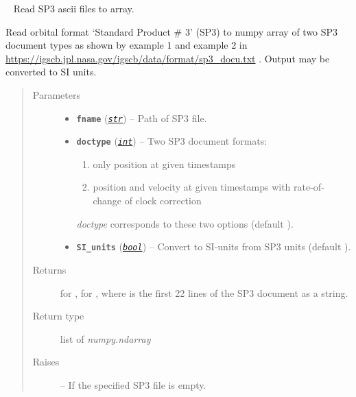 \documentclass[letterpaper,10pt,english]{sphinxhowto}
\begin{document}

\begin{fulllineitems}
\label{swtools_doc:swtools.read_sp3}~\label{swtools_doc:read-sp3}
Read SP3 ascii files to array.

Read orbital format `Standard Product \# 3' (SP3) to numpy array of
two SP3 document types  as shown by example 1 and example 2 in
\href{https://igscb.jpl.nasa.gov/igscb/data/format/sp3\_docu.txt}{https://igscb.jpl.nasa.gov/igscb/data/format/sp3\_docu.txt} . Output
may be converted to SI units.
\begin{quote}\begin{description}
\item[{Parameters}] \leavevmode\begin{itemize}
\item {} 
\textbf{\texttt{fname}} (\href{https://docs.python.org/library/functions.html\#str}{\emph{\texttt{str}}}) -- Path of SP3 file.

\item {} 
\textbf{\texttt{doctype}} (\href{https://docs.python.org/library/functions.html\#int}{\emph{\texttt{int}}}) -- 
Two SP3 document formats:
\begin{enumerate}
\item {} 
only position at given timestamps

\item {} 
position and velocity at given timestamps with
rate-of-change of clock correction

\end{enumerate}

\emph{doctype} corresponds to these two options (default ).


\item {} 
\textbf{\texttt{SI\_units}} (\href{https://docs.python.org/library/functions.html\#bool}{\emph{\texttt{bool}}}) -- Convert to SI-units from SP3 units (default ).

\end{itemize}

\item[{Returns}] \leavevmode
\code{{[}x, y, z, t, header{]}} for ,
\code{{[}x, y, z, vx, vy, vz, dt, t, header{]}} for ,
where  is the first 22 lines of the SP3 document as a
string.

\item[{Return type}] \leavevmode
list of \emph{numpy.ndarray}

\item[{Raises}] \leavevmode
{} --
If the specified SP3 file is empty.

\end{description}\end{quote}

\end{fulllineitems}
\end{document}
